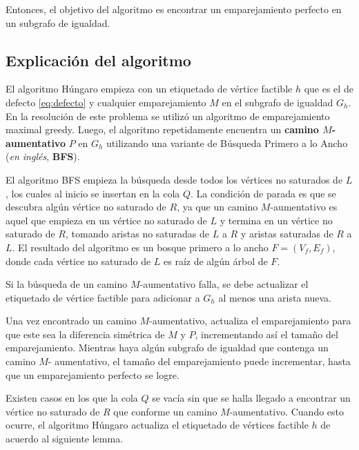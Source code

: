 \documentclass[10pt]{article} %
\begin{document}
	Entonces, el objetivo del algoritmo es encontrar un emparejamiento perfecto en un subgrafo de igualdad. 

\subsection{Explicaci\'on del algoritmo}


El algoritmo H\'ungaro empieza con un etiquetado de v\'ertice factible $h$ que es el de defecto \ref{eq:defecto} y cualquier emparejamiento $M$ en el subgrafo de igualdad $G_h$.  En la resoluci\'on de este problema se utiliz\'o un algoritmo de emparejamiento maximal greedy. Luego, el algoritmo repetidamente encuentra un \textbf{camino $M$-aumentativo} $P$ en $G_h$ utilizando una variante de B\'usqueda Primero a lo Ancho (\textit{en ingl\'es}, \textbf{BFS}). 

 El algoritmo BFS empieza la b\'usqueda desde todos los v\'ertices no saturados de $L$, los cuales al inicio se insertan en la cola $Q$. La condici\'on de parada es que se descubra alg\'un v\'ertice no saturado de $R$, ya que un camino $M$-aumentativo es aquel que empieza en un v\'ertice no saturado de $L$ y termina en un v\'ertice no saturado de $R$, tomando aristas no saturadas de $L$ a $R$ y aristas saturadas de $R$ a $L$. El resultado del algoritmo es un bosque primero a lo ancho $F = (V_f, E_f)$, donde cada v\'ertice no saturado de $L$ es ra\'iz de alg\'un \'arbol de $F$.


Si la b\'usqueda de un camino $M$-aumentativo falla, se debe actualizar el etiquetado de v\'ertice factible para adicionar a $G_h$ al menos una arista nueva.

Una vez encontrado un camino $M$-aumentativo, actualiza el emparejamiento para que este sea la diferencia sim\'etrica de $M$ y $P$, incrementando as\'i el tama\~no del emparejamiento.  Mientras haya alg\'un subgrafo de igualdad que contenga un camino $M$- aumentativo, el tama\~no del emparejamiento puede incrementar, hasta que un emparejamiento perfecto se logre.

	Existen casos en los que la cola $Q$ se vac\'ia sin que se halla llegado a encontrar un v\'ertice no saturado de $R$ que conforme un camino $M$-aumentativo. Cuando esto ocurre, el algoritmo H\'ungaro actualiza el etiquetado de v\'ertices factible $h$ de acuerdo al siguiente lemma.
	
\end{document}
